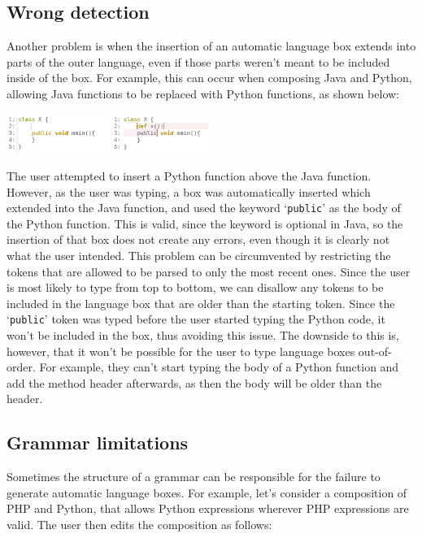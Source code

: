 \documentclass[sigplan,screen]{acmart}\settopmatter{printfolios=true,printccs=false,printacmref=false}
\newcommand{\qtt}[1]{`\texttt{#1}'\xspace}
\begin{document}
\subsection{Wrong detection}

Another problem is when the insertion of an automatic language box extends into
parts of the outer language, even if those parts weren't meant to be included
inside of the box. For example, this can occur when composing Java and Python,
allowing Java functions to be replaced with Python functions, as shown below:

\begin{center}
\includegraphics[width=0.50\textwidth]{images/autobox_limitjavapy.png}
\end{center}

The user attempted to insert a Python function above the Java function.
However, as the user was typing, a box was automatically inserted which
extended into the Java function, and used the keyword \qtt{public} as the body
of the Python function.  This is valid, since the keyword is optional in Java,
so the insertion of that box does not create any errors, even though it is
clearly not what the user intended.
This problem can be circumvented by restricting the tokens that are allowed to
be parsed to only the most recent ones. Since the user is most likely to type
from top to bottom, we can disallow any tokens to be included in the language
box that are older than the starting token. Since the \qtt{public} token was
typed before the user started typing the Python code, it won't be included in
the box, thus avoiding this issue. The downside to this is, however, that it won't be possible for
the user to type language boxes out-of-order.  For example, they can't start
typing the body of a Python function and add the method header afterwards, as
then the body will be older than the header.

\subsection{Grammar limitations}

Sometimes the structure of a grammar can be responsible for the failure to
generate automatic language boxes. For example, let's consider a composition of
PHP and Python, that allows Python expressions wherever PHP expressions are
valid. The user then edits the composition as follows:
\end{document}
